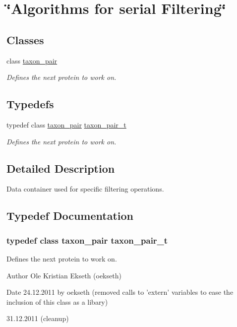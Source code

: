 \hypertarget{group__filtering__ops}{
\section{\char`\"{}Algorithms for serial Filtering\char`\"{}}
\label{group__filtering__ops}
}
\subsection*{Classes}
\begin{DoxyCompactItemize}
\item 
class \hyperlink{classtaxon__pair}{taxon\_\-pair}
\begin{DoxyCompactList}\small\item\em Defines the next protein to work on. \end{DoxyCompactList}\end{DoxyCompactItemize}
\subsection*{Typedefs}
\begin{DoxyCompactItemize}
\item 
typedef class \hyperlink{classtaxon__pair}{taxon\_\-pair} \hyperlink{group__filtering__ops_ga732a31467060ffc6a89ccff1aadd0d91}{taxon\_\-pair\_\-t}
\begin{DoxyCompactList}\small\item\em Defines the next protein to work on. \end{DoxyCompactList}\end{DoxyCompactItemize}


\subsection{Detailed Description}
Data container used for specific filtering operations. 

\subsection{Typedef Documentation}
\hypertarget{group__filtering__ops_ga732a31467060ffc6a89ccff1aadd0d91}{
\subsubsection[{taxon\_\-pair\_\-t}]{\setlength{\rightskip}{0pt plus 5cm}typedef class {\bf taxon\_\-pair} {\bf taxon\_\-pair\_\-t}}}
\label{group__filtering__ops_ga732a31467060ffc6a89ccff1aadd0d91}


Defines the next protein to work on. 

\begin{DoxyAuthor}{Author}
Ole Kristian Ekseth (oekseth) 
\end{DoxyAuthor}
\begin{DoxyDate}{Date}
24.12.2011 by oekseth (removed calls to 'extern' variables to ease the inclusion of this class as a libary) 

31.12.2011 (cleanup) 
\end{DoxyDate}
